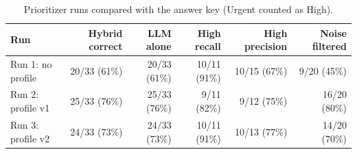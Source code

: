 \begin{table}[ht]
\centering
\small
\caption{Prioritizer runs compared with the answer key (Urgent counted as High).}
\label{tab:eval-summary}
\begin{tabular}{lrrrrr}
\toprule
Run & Hybrid correct & LLM alone & High recall & High precision & Noise filtered \\
\midrule
Run 1: no profile & 20/33 (61\%) & 20/33 (61\%) & 10/11 (91\%) & 10/15 (67\%) & 9/20 (45\%) \\
Run 2: profile v1 & 25/33 (76\%) & 25/33 (76\%) & 9/11 (82\%) & 9/12 (75\%) & 16/20 (80\%) \\
Run 3: profile v2 & 24/33 (73\%) & 24/33 (73\%) & 10/11 (91\%) & 10/13 (77\%) & 14/20 (70\%) \\
\bottomrule
\end{tabular}
\end{table}
